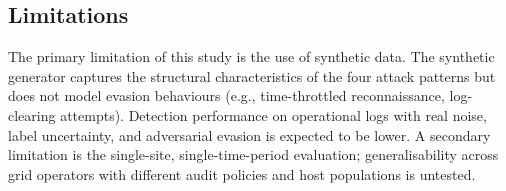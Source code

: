 \subsection{Limitations}

The primary limitation of this study is the use of synthetic data. The synthetic generator
captures the structural characteristics of the four attack patterns but does not model
evasion behaviours (e.g., time-throttled reconnaissance, log-clearing attempts). Detection
performance on operational logs with real noise, label uncertainty, and adversarial evasion
is expected to be lower. A secondary limitation is the single-site, single-time-period
evaluation; generalisability across grid operators with different audit policies and host
populations is untested.
